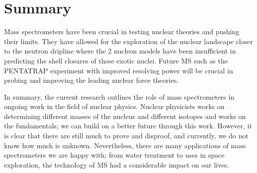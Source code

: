 \section{Summary}
 Mass spectrometers have been crucial in testing nuclear theories and pushing their limits.
 They have allowed for the exploration of the nuclear landscape closer to the neutron dripline where the 2 nucleon models have been insufficient in predicting the shell closures of these exotic nuclei.
 Future MS such as the PENTATRAP experiment with improved resolving power will be crucial in probing and improving the leading nuclear force theories. 
 
 In summary, the current research outlines the role of mass spectrometers in ongoing work in the field of nuclear physics.
 Nuclear physicists works on determining different masses of the nucleus and different isotopes and works on the fundamentals; we can build on a better future through this work.
 However, it is clear that there are still much to prove and disproof, and currently, we do not know how much is unknown.
 Nevertheless, there are many applications of mass spectrometers we are happy with; from water treatment to uses in space exploration, the technology of MS had a considerable impact on our lives.